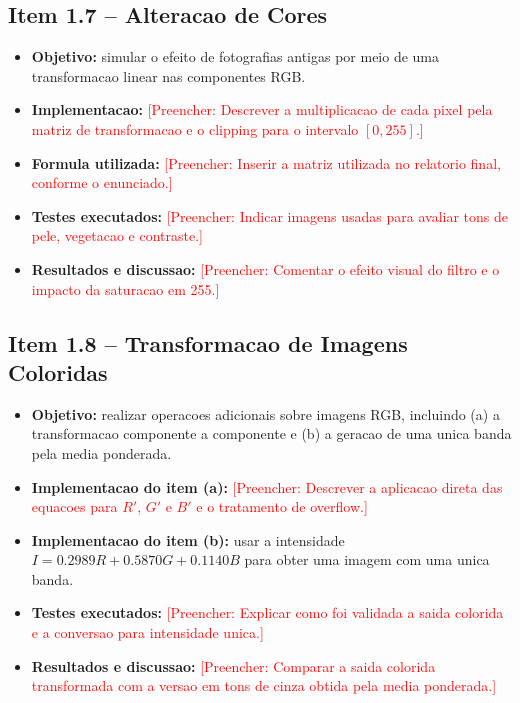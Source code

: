 \documentclass[12pt,a4paper]{article}
\newcommand{\placeholder}[1]{\textcolor{red}{[Preencher: #1]}}
\begin{document}
\subsection{Item 1.7 -- Alteracao de Cores}

\begin{itemize}[leftmargin=*]
  \item \textbf{Objetivo:} simular o efeito de fotografias antigas por meio de uma transformacao linear nas componentes RGB.
  \item \textbf{Implementacao:} \placeholder{Descrever a multiplicacao de cada pixel pela matriz de transformacao e o clipping para o intervalo $[0,255]$.}
  \item \textbf{Formula utilizada:} \placeholder{Inserir a matriz utilizada no relatorio final, conforme o enunciado.}
  \item \textbf{Testes executados:} \placeholder{Indicar imagens usadas para avaliar tons de pele, vegetacao e contraste.}
  \item \textbf{Resultados e discussao:} \placeholder{Comentar o efeito visual do filtro e o impacto da saturacao em 255.}
\end{itemize}

\subsection{Item 1.8 -- Transformacao de Imagens Coloridas}

\begin{itemize}[leftmargin=*]
  \item \textbf{Objetivo:} realizar operacoes adicionais sobre imagens RGB, incluindo (a) a transformacao componente a componente e (b) a geracao de uma unica banda pela media ponderada.
  \item \textbf{Implementacao do item (a):} \placeholder{Descrever a aplicacao direta das equacoes para $R'$, $G'$ e $B'$ e o tratamento de overflow.}
  \item \textbf{Implementacao do item (b):} usar a intensidade $I = 0.2989R + 0.5870G + 0.1140B$ para obter uma imagem com uma unica banda.
  \item \textbf{Testes executados:} \placeholder{Explicar como foi validada a saida colorida e a conversao para intensidade unica.}
  \item \textbf{Resultados e discussao:} \placeholder{Comparar a saida colorida transformada com a versao em tons de cinza obtida pela media ponderada.}
\end{itemize}
\end{document}
